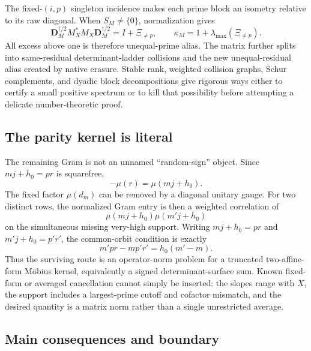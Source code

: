 The fixed-\((i,p)\) singleton incidence makes each prime block an isometry
relative to its raw diagonal.  When \(S_M\ne\{0\}\), normalization gives
\begin{equation}
 \mathbf D_M^{\dagger/2}M_X^*M_X\mathbf D_M^{\dagger/2}
 =I+\Xi_{\ne p},
 \qquad
 \kappa_M=1+\lambda_{\max}(\Xi_{\ne p}).
 \label{eq:tpc61-intro-prime-alias}
\end{equation}
All excess above one is therefore unequal-prime alias.  The matrix further
splits into same-residual determinant-ladder collisions and the new
unequal-residual alias created by native erasure.  Stable rank, weighted
collision graphs, Schur complements, and dyadic block decompositions give
rigorous ways either to certify a small positive spectrum or to kill that
possibility before attempting a delicate number-theoretic proof.

\subsection{The parity kernel is literal}

The remaining Gram is not an unnamed ``random-sign'' object.  Since
\(mj+h_0=p r\) is squarefree,
\begin{equation}
 -\mu(r)=\mu(mj+h_0).
 \label{eq:tpc61-intro-mu-n}
\end{equation}
The fixed factor \(\mu(d_m)\) can be removed by a diagonal unitary gauge.
For two distinct rows, the normalized Gram entry is then a weighted
correlation of
\begin{equation}
 \mu(mj+h_0)\mu(m'j+h_0)
 \label{eq:tpc61-intro-two-affine}
\end{equation}
on the simultaneous missing very-high support.  Writing
\(mj+h_0=pr\) and \(m'j+h_0=p'r'\), the common-orbit condition is exactly
\begin{equation}
 m'pr-mp'r'=h_0(m'-m).
 \label{eq:tpc61-intro-determinant}
\end{equation}
Thus the surviving route is an operator-norm problem for a truncated
two-affine-form M\"obius kernel, equivalently a signed determinant-surface
sum.  Known fixed-form or averaged cancellation cannot simply be inserted:
the slopes range with \(X\), the support includes a largest-prime cutoff and
cofactor mismatch, and the desired quantity is a matrix norm rather than a
single unrestricted average.

\subsection{Main consequences and boundary}

